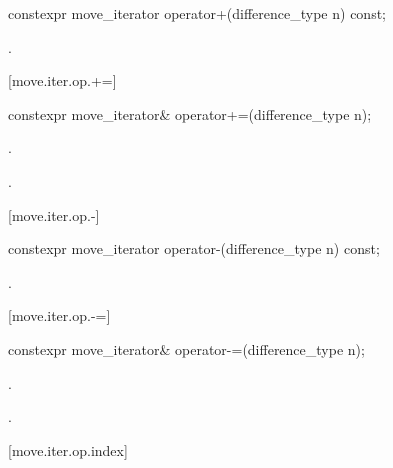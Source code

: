 %
%
\begin{itemdecl}
constexpr move_iterator operator+(difference_type n) const;
\end{itemdecl}

\begin{itemdescr}
\pnum
\returns {}.
\end{itemdescr}

[move.iter.op.+=]{}

%
%
\begin{itemdecl}
constexpr move_iterator& operator+=(difference_type n);
\end{itemdecl}

\begin{itemdescr}
\pnum
\effects {}.

\pnum
\returns {}.
\end{itemdescr}

[move.iter.op.-]{}

%
%
\begin{itemdecl}
constexpr move_iterator operator-(difference_type n) const;
\end{itemdecl}

\begin{itemdescr}
\pnum
\returns {}.
\end{itemdescr}

[move.iter.op.-=]{}

%
%
\begin{itemdecl}
constexpr move_iterator& operator-=(difference_type n);
\end{itemdecl}

\begin{itemdescr}
\pnum
\effects {}.

\pnum
\returns {}.
\end{itemdescr}

[move.iter.op.index]{}


